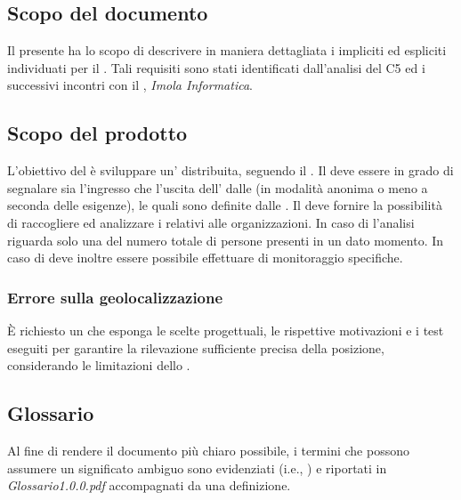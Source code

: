 \documentclass[../analisi-dei-requisiti]{subfiles}
\begin{document}
\subsection{Scopo del documento}%
\label{sub:scopo_del_documento}
Il presente  ha lo scopo di descrivere in maniera dettagliata i  impliciti ed espliciti individuati per il . Tali requisiti sono stati identificati dall'analisi del  C5 ed i successivi incontri con il , \textit{Imola Informatica}.
\subsection{Scopo del prodotto}%
\label{sub:scopo_del_prodotto}
L'obiettivo del  è sviluppare un' distribuita, seguendo il . Il  deve essere in grado di segnalare sia l'ingresso che l'uscita dell' dalle  (in modalità anonima o meno a seconda delle esigenze), le quali sono definite dalle . Il  deve fornire la possibilità di raccogliere ed analizzare i  relativi alle organizzazioni. In caso di  l'analisi riguarda solo una  del numero totale di persone presenti in un dato momento. In caso di  deve inoltre essere possibile effettuare  di monitoraggio specifiche.
\subsubsection{Errore sulla geolocalizzazione}%
\label{subp:errore_sulla_geolocalizzazione}
È richiesto un  che esponga le scelte progettuali, le rispettive motivazioni e i test eseguiti per garantire la rilevazione sufficiente precisa della posizione, considerando le limitazioni dello .
\subsection{Glossario}%
\label{sub:glossario}
Al fine di rendere il documento più chiaro possibile, i termini che possono assumere un significato ambiguo sono evidenziati (i.e., ) e riportati in \textit{Glossario1.0.0.pdf} accompagnati da una definizione.
\end{document}
